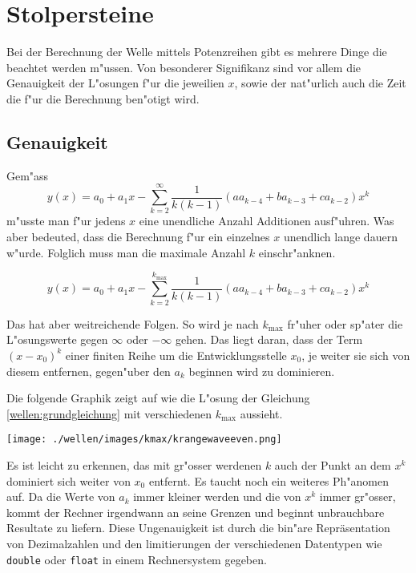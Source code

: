 \section{Stolpersteine}

Bei der Berechnung der Welle mittels Potenzreihen gibt es mehrere Dinge die 
beachtet werden m"ussen. Von besonderer Signifikanz sind vor allem die 
Genauigkeit der L"osungen f"ur die jeweilien $x$, sowie der nat"urlich auch die 
Zeit die f"ur die Berechnung ben"otigt wird.


\subsection{Genauigkeit}
Gem"ass
\begin{equation*}
	y(x) = a_0 + a_1x 
	-\sum_{k=2}^{\infty}\frac{1}{k(k-1)}(aa_{k-4}+ba_{k-3}+ca_{k-2})x^k
\end{equation*}
m"usste man f"ur jedens $x$ eine unendliche Anzahl Additionen ausf"uhren. Was 
aber bedeuted, dass die Berechnung f"ur ein einzelnes $x$ unendlich lange 
dauern w"urde. Folglich muss man die maximale Anzahl $k$ einschr"anknen.

\begin{equation*}
	y(x) = a_0 + a_1x 
	-\sum_{k=2}^{k_{\text{max}}}\frac{1}{k(k-1)}(aa_{k-4}+ba_{k-3}+ca_{k-2})x^k
\end{equation*}

Das hat aber weitreichende Folgen. So wird je nach $k_{\text{max}}$ fr"uher 
oder sp"ater die L"osungswerte gegen $\infty$ oder $-\infty$ gehen. Das liegt 
daran, dass der Term $(x - x_0)^k$ einer finiten Reihe um die 
Entwicklungsstelle $x_0$, je weiter sie sich von diesem entfernen, gegen"uber 
den $a_k$ beginnen wird zu dominieren.

Die folgende Graphik zeigt auf wie die L"osung der Gleichung 
\ref{wellen:grundgleichung} mit verschiedenen $k_{\text{max}}$ aussieht.

\begin{center}
	\texttt{[image: ./wellen/images/kmax/krangewaveeven.png]}
\end{center}

Es ist leicht zu erkennen, das mit gr"osser werdenen $k$ auch der Punkt an dem 
$x^k$ dominiert sich weiter von $x_0$ entfernt. Es taucht noch ein weiteres 
Ph"anomen auf. Da die Werte von $a_k$ immer kleiner werden und die von $x^k$ 
immer gr"osser, kommt der Rechner irgendwann an seine Grenzen und beginnt 
unbrauchbare Resultate zu liefern. Diese Ungenauigkeit ist durch die bin"are 
Repräsentation von Dezimalzahlen und den limitierungen der verschiedenen 
Datentypen wie \texttt{double} oder \texttt{float} in einem Rechnersystem 
gegeben.

